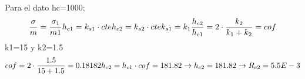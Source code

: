 Para el dato hc=1000;
\begin{equation}
	\dfrac{\sigma}{m}=\dfrac{\sigma_1}{m1}	\\ h_{c1}=k_{s1}\cdot cte \\ h_{c2}=k_{s2}\cdot cte	\\ k_{s1}=k_1 \\ \dfrac{h_{c2}}{h_{c1}}= 2\cdot \dfrac{k_2}{k_1+k_2}=cof
\end{equation}
k1=15 y k2=1.5
\begin{equation}
	cof=2\cdot \dfrac{1.5}{15+1.5}=0.18182
	\\ h_{c2}=h_{c1}\cdot cof=181.82 \rightarrow h_{c2}=181.82 \rightarrow R_{c2}=5.5E-3
\end{equation}